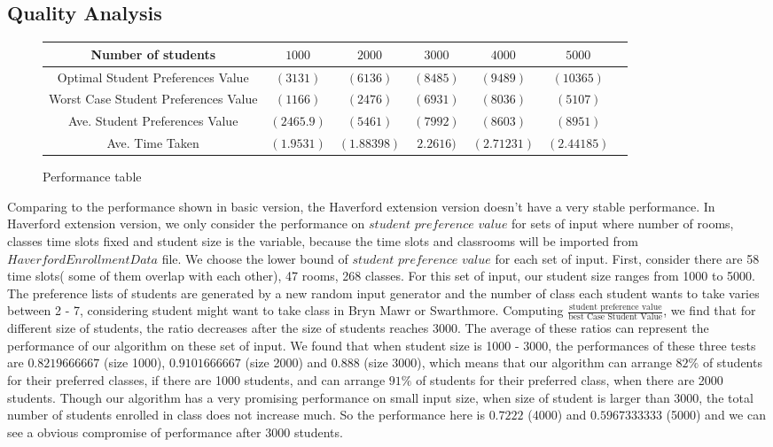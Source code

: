 \documentclass[11pt, oneside]{article}   	%
\begin{document}
\subsection{Quality Analysis}
\begin{figure}[H]
\centering
\begin{tabular}{ |c||c|c|c|c|c|c| } 
 \hline
 Number of students & $1000$  & $2000$ & $3000$ & $4000$ & $5000$\\ 
  \hline \hline 
 Optimal Student Preferences Value & $(3131)$ & $(6136)$  & $(8485)$ & $(9489)$ & $(10365)$ \\
  \hline
Worst Case Student Preferences Value& $(1166)$ & $(2476)$ & $(6931)$ & $(8036)$ & $(5107)$ \\ 
 \hline
Ave. Student Preferences Value& $(2465.9)$ & $(5461)$ & $(7992)$ & $(8603)$ & $(8951)$ \\
 \hline
 Ave. Time Taken & $(1.9531)$ & $(1.88398)$ & $2.2616)$ & $(2.71231)$ & $(2.44185)$ \\
 \hline
\end{tabular}
\caption{Performance table} %
\end{figure}
Comparing to the performance shown in basic version, the Haverford extension version doesn't have a very stable performance. In Haverford extension version, we only consider the performance on $student$ $preference$ $value$ for sets of input where number of rooms, classes time slots fixed and student size is the variable, because the time slots and classrooms will be imported from $HaverfordEnrollmentData$ file. We choose the lower bound of $student$ $preference$ $value$ for each set of input. First, consider there are 58 time slots( some of them overlap with each other), 47 rooms, 268 classes. For this set of input, our student size ranges from 1000 to 5000. The preference lists of students are generated by a new random input generator and the number of class each student wants to take varies between 2 - 7, considering student might want to take class in Bryn Mawr or Swarthmore. Computing $\frac{\text{student preference value}}{\text{best Case Student Value}}$, we find that for different size of students, the ratio decreases after the size of students reaches 3000. The average of these ratios can represent the performance of our algorithm on these set of input. We found that when student size is 1000 - 3000, the performances of these three tests are $0.8219666667$ (size 1000), $0.9101666667$ (size 2000) and $0.888$ (size 3000), which means that our algorithm can arrange $82\%$ of students for their preferred classes, if there are 1000 students, and can arrange $91\%$ of students for their preferred class, when there are 2000 students. Though our algorithm has a very promising performance on small input size, when size of student is larger than 3000, the total number of students enrolled in class does not increase much. So the performance here is $0.7222$ (4000) and $0.5967333333$ (5000) and we can see a obvious compromise of performance after 3000 students.
\end{document}
